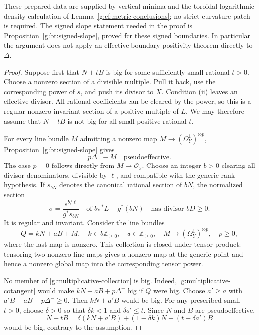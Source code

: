 These prepared data are supplied by vertical minima and the toroidal
logarithmic density calculation of
Lemma~\ref{g:cf:metric-conclusions}; no strict-curvature patch is
required. The signed slope statement needed in the proof is
Proposition~\ref{g:bt:signed-slope}, proved for these signed boundaries.
In particular the argument does not apply an effective-boundary
positivity theorem directly to $\Delta$.

\begin{proof}
Suppose first that $N+tB$ is big for some sufficiently small rational
$t>0$. Choose a nonzero section of a divisible multiple. Pull it back,
use the corresponding power of $s$, and push its divisor to $X$.
Condition (ii) leaves an effective divisor. All rational coefficients
can be cleared by the power, so this is a regular nonzero invariant
section of a positive multiple of $L$. We may therefore assume that
$N+tB$ is not big for all small positive rational $t$.

For every line bundle $M$ admitting a nonzero map
$M\to(\Omega_Y^1)^{\otimes p}$,
Proposition~\ref{g:bt:signed-slope} gives
\begin{equation}\label{g:multiplicative-cotangent}
 p\Delta^- -M\quad\text{pseudoeffective}.
\end{equation}
The case $p=0$ follows directly from $M\to\mathcal O_Y$.
Choose an integer $b>0$ clearing all divisor denominators, divisible by
$\ell$, and compatible with the generic-rank hypothesis. If $s_{bN}$
denotes the canonical rational section of $bN$, the normalized section
\[
 \sigma=\frac{s^{b/\ell}}{g^*s_{bN}}
 \quad\text{of }b\pi^*L-g^*(bN)
 \quad\text{has divisor }bD\geq0.
\]
It is regular and invariant. Consider the
line bundles
\begin{equation}\label{g:multiplicative-collection}
 Q=kN+aB+M,
 \quad k\in b\mathbb Z_{\geq0},\quad a\in\mathbb Z_{\geq0},
 \quad M\longrightarrow(\Omega_Y^1)^{\otimes p},\quad p\geq0,
\end{equation}
where the last map is nonzero. This collection is closed under tensor
product: tensoring two nonzero line maps gives a nonzero map at the
generic point and hence a nonzero global map into the corresponding
tensor power.

No member of \eqref{g:multiplicative-collection} is big. Indeed,
\eqref{g:multiplicative-cotangent} would make
$kN+aB+p\Delta^-$ big if $Q$ were big. Choose $a'\geq a$ with
$a'B-aB-p\Delta^-\geq0$. Then $kN+a'B$ would be big. For any prescribed
small $t>0$, choose $\delta>0$ so that $\delta k<1$ and
$\delta a'\leq t$. Since $N$ and $B$ are pseudoeffective,
\[
 N+tB=\delta(kN+a'B)+(1-\delta k)N+(t-\delta a')B
\]
would be big, contrary to the assumption.


\end{proof}
